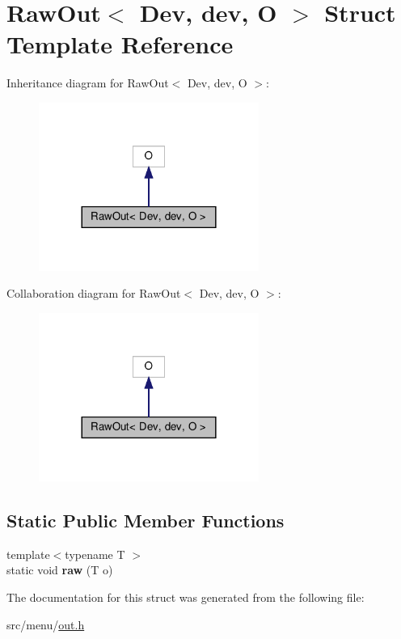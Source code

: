 \hypertarget{structRawOut}{}\section{Raw\+Out$<$ Dev, dev, O $>$ Struct Template Reference}
\label{structRawOut}


Inheritance diagram for Raw\+Out$<$ Dev, dev, O $>$\+:\nopagebreak
\begin{figure}[H]
\begin{center}
\leavevmode
\includegraphics[width=204pt]{structRawOut__inherit__graph}
\end{center}
\end{figure}


Collaboration diagram for Raw\+Out$<$ Dev, dev, O $>$\+:\nopagebreak
\begin{figure}[H]
\begin{center}
\leavevmode
\includegraphics[width=204pt]{structRawOut__coll__graph}
\end{center}
\end{figure}
\subsection*{Static Public Member Functions}
\begin{DoxyCompactItemize}
\item 
\mbox{\label{structRawOut_ad4171805d902b301ea83e7bd62787f06}} 
{\footnotesize template$<$typename T $>$ }\\static void {\bfseries raw} (T o)
\end{DoxyCompactItemize}


The documentation for this struct was generated from the following file\+:\begin{DoxyCompactItemize}
\item 
src/menu/\hyperlink{out_8h}{out.\+h}\end{DoxyCompactItemize}
